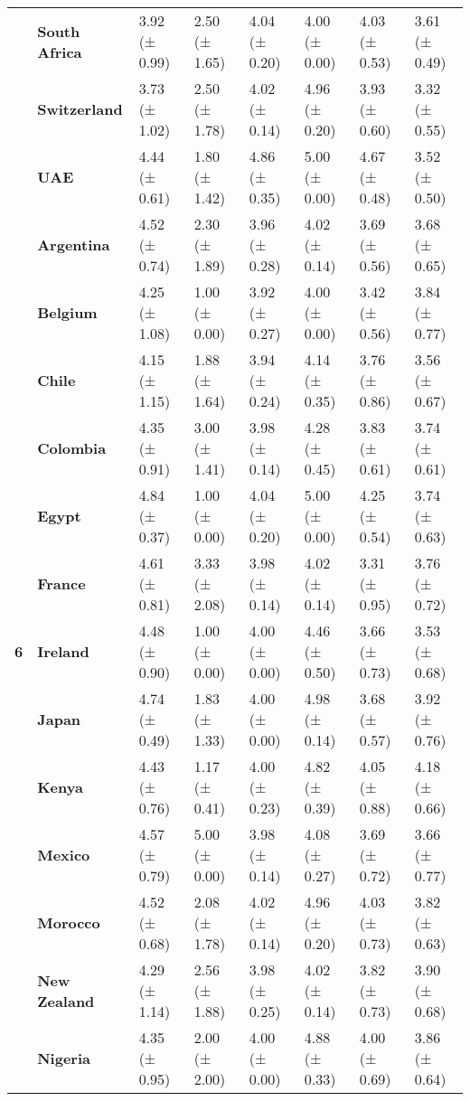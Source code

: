\begin{longtable}{llllllll}
\textbf{} & \textbf{South Africa} & 3.92 (± 0.99) & 2.50 (± 1.65) & 4.04 (± 0.20) & 4.00 (± 0.00) & 4.03 (± 0.53) & 3.61 (± 0.49) \\
\textbf{} & \textbf{Switzerland} & 3.73 (± 1.02) & 2.50 (± 1.78) & 4.02 (± 0.14) & 4.96 (± 0.20) & 3.93 (± 0.60) & 3.32 (± 0.55) \\
\textbf{} & \textbf{UAE} & 4.44 (± 0.61) & 1.80 (± 1.42) & 4.86 (± 0.35) & 5.00 (± 0.00) & 4.67 (± 0.48) & 3.52 (± 0.50) \\
\cline{1-8}
\multirow[t]{19}{*}{\textbf{6}} & \textbf{Argentina} & 4.52 (± 0.74) & 2.30 (± 1.89) & 3.96 (± 0.28) & 4.02 (± 0.14) & 3.69 (± 0.56) & 3.68 (± 0.65) \\
\textbf{} & \textbf{Belgium} & 4.25 (± 1.08) & 1.00 (± 0.00) & 3.92 (± 0.27) & 4.00 (± 0.00) & 3.42 (± 0.56) & 3.84 (± 0.77) \\
\textbf{} & \textbf{Chile} & 4.15 (± 1.15) & 1.88 (± 1.64) & 3.94 (± 0.24) & 4.14 (± 0.35) & 3.76 (± 0.86) & 3.56 (± 0.67) \\
\textbf{} & \textbf{Colombia} & 4.35 (± 0.91) & 3.00 (± 1.41) & 3.98 (± 0.14) & 4.28 (± 0.45) & 3.83 (± 0.61) & 3.74 (± 0.61) \\
\textbf{} & \textbf{Egypt} & 4.84 (± 0.37) & 1.00 (± 0.00) & 4.04 (± 0.20) & 5.00 (± 0.00) & 4.25 (± 0.54) & 3.74 (± 0.63) \\
\textbf{} & \textbf{France} & 4.61 (± 0.81) & 3.33 (± 2.08) & 3.98 (± 0.14) & 4.02 (± 0.14) & 3.31 (± 0.95) & 3.76 (± 0.72) \\
\textbf{} & \textbf{Ireland} & 4.48 (± 0.90) & 1.00 (± 0.00) & 4.00 (± 0.00) & 4.46 (± 0.50) & 3.66 (± 0.73) & 3.53 (± 0.68) \\
\textbf{} & \textbf{Japan} & 4.74 (± 0.49) & 1.83 (± 1.33) & 4.00 (± 0.00) & 4.98 (± 0.14) & 3.68 (± 0.57) & 3.92 (± 0.76) \\
\textbf{} & \textbf{Kenya} & 4.43 (± 0.76) & 1.17 (± 0.41) & 4.00 (± 0.23) & 4.82 (± 0.39) & 4.05 (± 0.88) & 4.18 (± 0.66) \\
\textbf{} & \textbf{Mexico} & 4.57 (± 0.79) & 5.00 (± 0.00) & 3.98 (± 0.14) & 4.08 (± 0.27) & 3.69 (± 0.72) & 3.66 (± 0.77) \\
\textbf{} & \textbf{Morocco} & 4.52 (± 0.68) & 2.08 (± 1.78) & 4.02 (± 0.14) & 4.96 (± 0.20) & 4.03 (± 0.73) & 3.82 (± 0.63) \\
\textbf{} & \textbf{New Zealand} & 4.29 (± 1.14) & 2.56 (± 1.88) & 3.98 (± 0.25) & 4.02 (± 0.14) & 3.82 (± 0.73) & 3.90 (± 0.68) \\
\textbf{} & \textbf{Nigeria} & 4.35 (± 0.95) & 2.00 (± 2.00) & 4.00 (± 0.00) & 4.88 (± 0.33) & 4.00 (± 0.69) & 3.86 (± 0.64) \\

\end{longtable}
